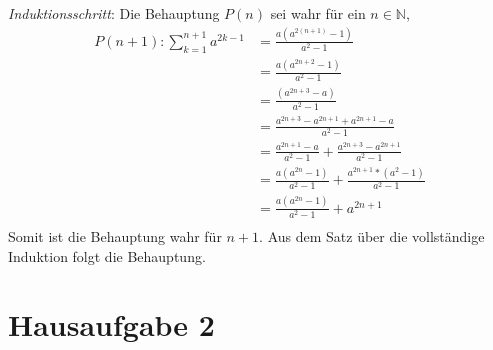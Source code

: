 \documentclass{article}
\begin{document}
\begin{enumerate}[a)]
  \emph{Induktionsschritt}:  Die Behauptung $P(n)$ sei wahr für ein $n \in \mathbb{N}$,
  \begin{align*}
    P(n + 1) \colon \sum\limits_{k = 1}^{n + 1} a^{2k - 1} &= \frac{a(a^{2(n + 1)} - 1)}{a^2 - 1}  \\
                                                           &= \frac{a(a^{2n + 2} - 1)}{a^2 - 1}  \\
                                                           &= \frac{(a^{2n + 3} - a)}{a^2 - 1}  \\   
                                                           &= \frac{a^{2n + 3} - a^{2n + 1} + a^{2n + 1} - a}{a^2 - 1} \\
                                                           &= \frac{a^{2n + 1} - a}{a^2 - 1} + \frac{a^{2n + 3} - a^{2n + 1}}{a^2 - 1}  \\
                                                           &= \frac{a(a^{2n} - 1)}{a^2 - 1} + \frac{a^{2n + 1} * (a^2 - 1)}{a^2 - 1}  \\
                                                           &= \frac{a(a^{2n} - 1)}{a^2 - 1} + a^{2n + 1}  \\
  \end{align*}
  Somit ist die Behauptung wahr für $n + 1$. Aus dem Satz über die vollständige Induktion folgt die Behauptung.
\end{enumerate}

\newpage
\section*{Hausaufgabe 2}
\end{document}
